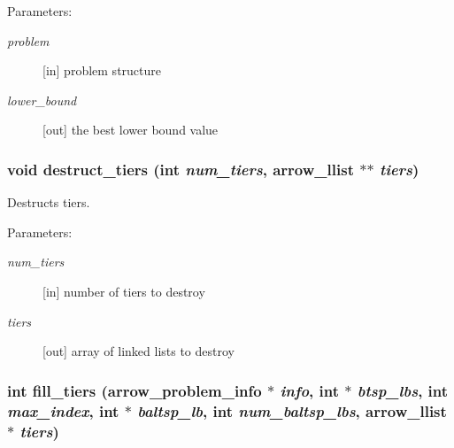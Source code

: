 \begin{Desc}
\item[Parameters:]
\begin{description}
\item[{\em problem}]\mbox{[}in\mbox{]} problem structure \item[{\em lower\_\-bound}]\mbox{[}out\mbox{]} the best lower bound value \end{description}
\end{Desc}
\hypertarget{lib_2baltsp_2baltsp-ib2_8c_086f8eb237774105f487040ef6ac62df}{
\subsubsection[{destruct\_\-tiers}]{\setlength{\rightskip}{0pt plus 5cm}void destruct\_\-tiers (int {\em num\_\-tiers}, \/  {\bf arrow\_\-llist} $\ast$$\ast$ {\em tiers})}}
\label{lib_2baltsp_2baltsp-ib2_8c_086f8eb237774105f487040ef6ac62df}


Destructs tiers. 

\begin{Desc}
\item[Parameters:]
\begin{description}
\item[{\em num\_\-tiers}]\mbox{[}in\mbox{]} number of tiers to destroy \item[{\em tiers}]\mbox{[}out\mbox{]} array of linked lists to destroy \end{description}
\end{Desc}
\hypertarget{lib_2baltsp_2baltsp-ib2_8c_42c557c4a5d3133300ce63b8b5e291c5}{
\subsubsection[{fill\_\-tiers}]{\setlength{\rightskip}{0pt plus 5cm}int fill\_\-tiers ({\bf arrow\_\-problem\_\-info} $\ast$ {\em info}, \/  int $\ast$ {\em btsp\_\-lbs}, \/  int {\em max\_\-index}, \/  int $\ast$ {\em baltsp\_\-lb}, \/  int {\em num\_\-baltsp\_\-lbs}, \/  {\bf arrow\_\-llist} $\ast$ {\em tiers})}}
\label{lib_2baltsp_2baltsp-ib2_8c_42c557c4a5d3133300ce63b8b5e291c5}



